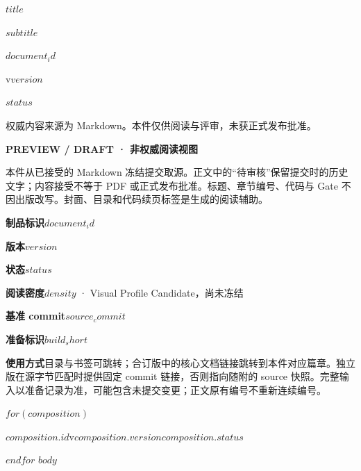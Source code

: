 \documentclass[UTF8,fontset=none,scheme=plain,11pt,a4paper,oneside,openany]{kbbook}
\begin{document}
\pagestyle{empty}
\pagecolor{PreviewNavy}\color{white}
\vspace*{30mm}
\begin{flushleft}{\sffamily\bfseries\fontsize{29}{38}\selectfont $title$\par}\end{flushleft}
\vspace{8mm}
{\sffamily\large $subtitle$\par}
\vfill
{\sffamily\small $document_id$\par\medskip v$version$\par\medskip $status$\par}
\vspace{10mm}
{\small 权威内容来源为 Markdown。本件仅供阅读与评审，未获正式发布批准。\par}
\clearpage\nopagecolor\color{PreviewInk}\pagestyle{fancy}
\noindent\textbf{PREVIEW / DRAFT · 非权威阅读视图}

本件从已接受的 Markdown 冻结提交取源。正文中的“待审核”保留提交时的历史文字；内容接受不等于 PDF 或正式发布批准。标题、章节编号、代码与 Gate 不因出版改写。封面、目录和代码续页标签是生成的阅读辅助。

\medskip
\noindent\textbf{制品标识}\quad $document_id$\par
\noindent\textbf{版本}\quad $version$\par
\noindent\textbf{状态}\quad $status$\par
\noindent\textbf{阅读密度}\quad $density$ · Visual Profile Candidate，尚未冻结\par
\noindent\textbf{基准 commit}\quad\texttt{$source_commit$}\par
\noindent\textbf{准备标识}\quad\texttt{$build_short$}\par
\noindent\textbf{使用方式}\quad 目录与书签可跳转；合订版中的核心文档链接跳转到本件对应篇章。独立版在源字节匹配时提供固定 commit 链接，否则指向随附的 source 快照。完整输入以准备记录为准，可能包含未提交变更；正文原有编号不重新连续编号。

$for(composition)$
\par\noindent\hyperlink{$composition.anchor$}{\textbf{$composition.id$}}\quad v$composition.version$\quad $composition.status$\par
$endfor$
\clearpage
\setcounter{tocdepth}{$toc_depth$}
\tableofcontents
\clearpage
$body$
\end{document}
